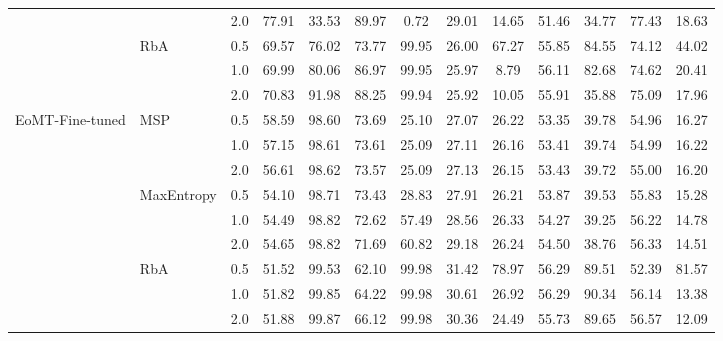 \begin{table}[!htbp]
{\begin{tabular}{llc|cc|cc|cc|cc|cc}
                &            & 2.0 & 77.91 & 33.53 & 89.97 & 0.72  & 29.01 & 14.65 & 51.46 & 34.77 & 77.43 & 18.63 \\
                & RbA        & 0.5 & 69.57 & 76.02 & 73.77 & 99.95 & 26.00 & 67.27 & 55.85 & 84.55 & 74.12 & 44.02 \\
                &            & 1.0 & 69.99 & 80.06 & 86.97 & 99.95 & 25.97 & 8.79  & 56.11 & 82.68 & 74.62 & 20.41 \\
                &            & 2.0 & 70.83 & 91.98 & 88.25 & 99.94 & 25.92 & 10.05 & 55.91 & 35.88 & 75.09 & 17.96 \\
\midrule
EoMT-Fine-tuned & MSP        & 0.5 & 58.59 & 98.60 & 73.69 & 25.10 & 27.07 & 26.22 & 53.35 & 39.78 & 54.96 & 16.27 \\
                &            & 1.0 & 57.15 & 98.61 & 73.61 & 25.09 & 27.11 & 26.16 & 53.41 & 39.74 & 54.99 & 16.22 \\
                &            & 2.0 & 56.61 & 98.62 & 73.57 & 25.09 & 27.13 & 26.15 & 53.43 & 39.72 & 55.00 & 16.20 \\
                & MaxEntropy & 0.5 & 54.10 & 98.71 & 73.43 & 28.83 & 27.91 & 26.21 & 53.87 & 39.53 & 55.83 & 15.28 \\
                &            & 1.0 & 54.49 & 98.82 & 72.62 & 57.49 & 28.56 & 26.33 & 54.27 & 39.25 & 56.22 & 14.78 \\
                &            & 2.0 & 54.65 & 98.82 & 71.69 & 60.82 & 29.18 & 26.24 & 54.50 & 38.76 & 56.33 & 14.51 \\
                & RbA        & 0.5 & 51.52 & 99.53 & 62.10 & 99.98 & 31.42 & 78.97 & 56.29 & 89.51 & 52.39 & 81.57 \\
                &            & 1.0 & 51.82 & 99.85 & 64.22 & 99.98 & 30.61 & 26.92 & 56.29 & 90.34 & 56.14 & 13.38 \\
                &            & 2.0 & 51.88 & 99.87 & 66.12 & 99.98 & 30.36 & 24.49 & 55.73 & 89.65 & 56.57 & 12.09 \\
\bottomrule
\end{tabular}}
\end{table}